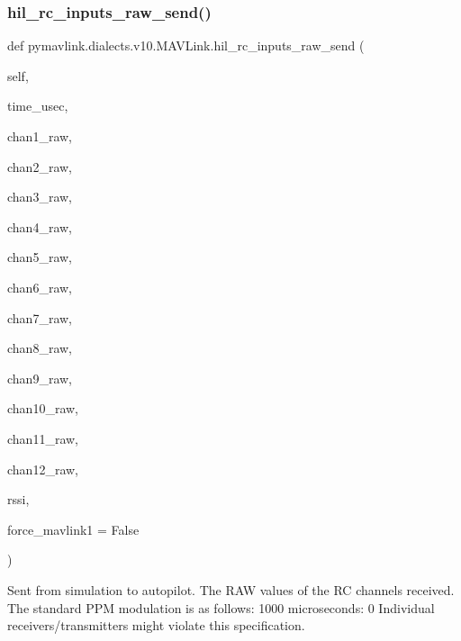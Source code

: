 \begin{DoxyVerb}
\begin{DoxyVerb}
\begin{DoxyVerb}
\subsubsection{\texorpdfstring{hil\+\_\+rc\+\_\+inputs\+\_\+raw\+\_\+send()}{hil\_rc\_inputs\_raw\_send()}}
{\footnotesize\ttfamily def pymavlink.\+dialects.\+v10.\+M\+A\+V\+Link.\+hil\+\_\+rc\+\_\+inputs\+\_\+raw\+\_\+send (\begin{DoxyParamCaption}\item[{}]{self,  }\item[{}]{time\+\_\+usec,  }\item[{}]{chan1\+\_\+raw,  }\item[{}]{chan2\+\_\+raw,  }\item[{}]{chan3\+\_\+raw,  }\item[{}]{chan4\+\_\+raw,  }\item[{}]{chan5\+\_\+raw,  }\item[{}]{chan6\+\_\+raw,  }\item[{}]{chan7\+\_\+raw,  }\item[{}]{chan8\+\_\+raw,  }\item[{}]{chan9\+\_\+raw,  }\item[{}]{chan10\+\_\+raw,  }\item[{}]{chan11\+\_\+raw,  }\item[{}]{chan12\+\_\+raw,  }\item[{}]{rssi,  }\item[{}]{force\+\_\+mavlink1 = {\ttfamily False} }\end{DoxyParamCaption})}

\begin{DoxyVerb}Sent from simulation to autopilot. The RAW values of the RC channels
received. The standard PPM modulation is as follows:
1000 microseconds: 0%
Individual receivers/transmitters might violate this
specification.


\end{DoxyVerb}
\end{DoxyVerb}
\end{DoxyVerb}
\end{DoxyVerb}
